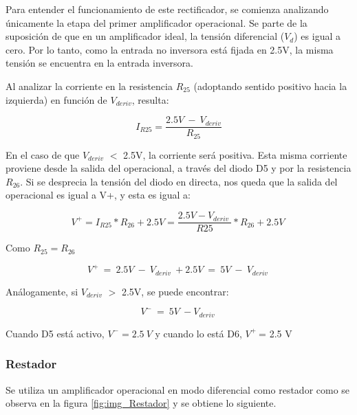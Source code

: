 \noindent Para entender el funcionamiento de este rectificador, se comienza analizando \'{u}nicamente la etapa del primer amplificador operacional. Se parte de la suposici\'{o}n de que en un amplificador ideal, la tensi\'{o}n diferencial ($V_d$) es igual a cero. Por lo tanto, como la entrada no inversora est\'{a} fijada en 2.5V, la misma tensi\'{o}n se encuentra en la entrada inversora.

\noindent Al analizar la corriente en la resistencia $R_{25}$ (adoptando sentido positivo hacia la izquierda) en funci\'{o}n de $V_{deriv}$, resulta:

\begin{equation} \label{eq_corriente_r25}
	I_{R25}=\frac{2.5V\ -\ V_{deriv}}{R_{25}}
\end{equation}

\noindent En el caso de que $V_{deriv}$ $\mathrm{<}$ 2.5V, la corriente ser\'{a} positiva. Esta misma corriente proviene desde la salida del operacional, a trav\'{e}s del diodo D5 y por la resistencia $R_{26}$. Si se desprecia la tensi\'{o}n del diodo en directa, nos queda que la salida del operacional es igual a V+, y esta es igual a:

\begin{equation} \label{eq_V+}
	V^+=I_{R25}*R_{26}+2.5V=\frac{2.5V-V_{deriv}\ }{R25}*R_{26}+2.5V\ 
\end{equation} 

Como $R_{25}=R_{26}$

\begin{equation} \label{eq_V+_2}
	V^+\ =\ 2.5V\ -\ V_{deriv}\ +2.5V\ =\ 5V\ -\ V_{deriv}\ 
\end{equation}

An\'{a}logamente, si $V_{deriv}$ $\mathrm{>}$ 2.5V, se puede encontrar:

\begin{equation} \label{eq_V+_3}
	V^-\ =\ {5V\ -V}_{deriv}\ 
\end{equation}

Cuando D5 est\'{a} activo, $V^-=2.5\ V$ y cuando lo est\'{a} D6, $V^+\ $= 2.5 V

\subsubsection{Restador}

\noindent Se utiliza un amplificador operacional en modo diferencial como restador como se observa en la figura \ref{fig:img_Restador} y se obtiene lo siguiente.

